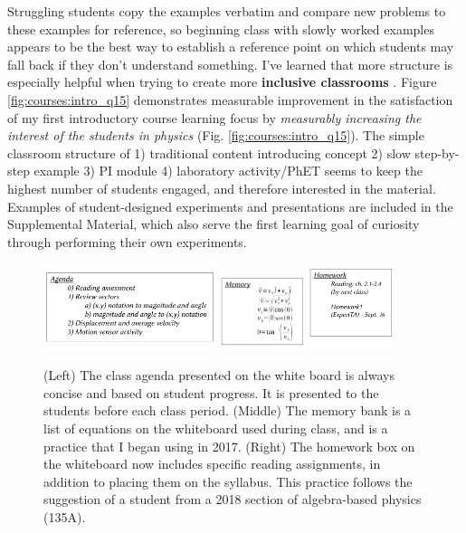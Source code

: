 \documentclass[../../main.tex]{subfiles}
\begin{document}
Struggling students copy the examples verbatim and compare new problems to these examples for reference, so beginning class with slowly worked examples appears to be the best way to establish a reference point on which students may fall back if they don't understand something.  I've learned that more structure is especially helpful when trying to create more \textbf{inclusive classrooms} \cite{inclusive}. Figure \ref{fig:courses:intro_q15} demonstrates measurable improvement in the satisfaction of my first introductory course learning focus by \textit{measurably increasing the interest of the students in physics} (Fig. \ref{fig:courses:intro_q15}).  The simple classroom structure of 1) traditional content introducing concept 2) slow step-by-step example 3) PI module 4) laboratory activity/PhET seems to keep the highest number of students engaged, and therefore interested in the material. Examples of student-designed experiments and presentations are included in the Supplemental Material, which also serve the first learning goal of curiosity through performing their own experiments.\\ \hspace{0.1cm}

\begin{figure}[ht]
\centering
\includegraphics[width=0.45\textwidth]{ExampleAgenda.pdf}
\includegraphics[width=0.22\textwidth]{ExampleMemory.pdf}
\includegraphics[width=0.22\textwidth]{ExampleHomework.pdf}
\caption{\label{fig:courses:intro:exampleAgenda} (Left) The class agenda presented on the white board is always concise and based on student progress.  It is presented to the students before each class period.  (Middle) The memory bank is a list of equations on the whiteboard used during class, and is a practice that I began using in 2017.  (Right) The homework box on the whiteboard now includes specific reading assignments, in addition to placing them on the syllabus.  This practice follows the suggestion of a student from a 2018 section of algebra-based physics (135A).}
\end{figure}
\end{document}
